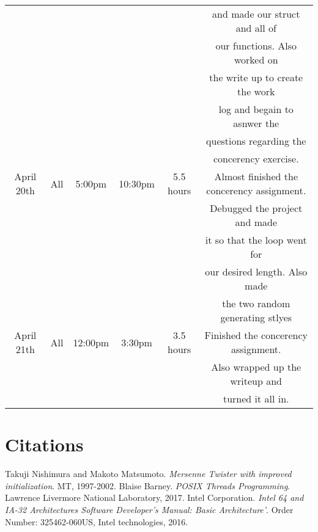 \begin{center}
\begin{tabular}{ |c|c|c|c|c|c| }
    &  &  &  &  & and made our struct and all of \\
    &  &  &  &  & our functions. Also worked on\\
    &  &  &  &  & the write up to create the work\\
    &  &  &  &  & log and begain to asnwer the\\
    &  &  &  &  & questions regarding the \\
    &  &  &  &  & concerency exercise. \\
   \hline
   April 20th & All & 5:00pm & 10:30pm & 5.5 hours & Almost finished the concerency assignment.\\
    &  &  &  &  & Debugged the project and made\\
    &  &  &  &  & it so that the loop went for \\
    &  &  &  &  & our desired length. Also made\\
    &  &  &  &  & the two random generating stlyes\\
   \hline
   April 21th & All & 12:00pm & 3:30pm & 3.5 hours & Finished the concerency assignment.\\
    &  &  &  &  & Also wrapped up the writeup and\\
    &  &  &  &  & turned it all in.\\
   \hline
\end{tabular}
\end{center}

\section{Citations}
\begin{thebibliography}{9}
      Takuji Nishimura and Makoto Matsumoto.
      \textit{Mersenne Twister with improved initialization}.
      MT, 1997-2002.
      Blaise Barney.
      \textit{POSIX Threads Programming}.
      Lawrence Livermore National Laboratory, 2017.
      Intel Corporation.
      \textit{Intel 64 and IA-32 Architectures Software Developer's Manual: Basic Architecture'}.
      Order Number: 325462-060US, Intel technologies, 2016.
   \end{thebibliography}

